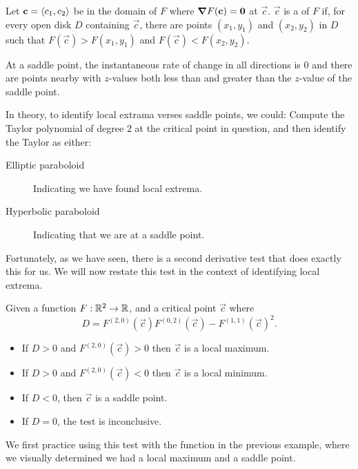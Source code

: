 \documentclass{ximera}
\begin{document}
\begin{definition}
  Let $\mathbf{c}=\left\langle c_1,c_2\right\rangle$ be in the domain of $F$ where $\boldsymbol\nabla
  F(\mathbf{c})=\mathbf{0}$ at $\vec{c}$. $\vec{c}$ is a  of $F$ if,
  for every open disk $D$ containing $\vec{c}$, there are points $(x_1,y_1)$
  and $(x_2,y_2)$ in $D$ such that $F(\vec{c})>F(x_1,y_1)$ and
  $F(\vec{c})<F(x_2,y_2)$.  
\end{definition}

At a saddle point, the instantaneous rate of change in all directions
is $0$ and there are points nearby with $z$-values both less than and
greater than the $z$-value of the saddle point.

In theory, to identify local extrama verses saddle points, we could:
Compute the Taylor polynomial of degree $2$ at the critical point in
question, and then identify the Taylor as either:
\begin{description}
\item[Elliptic paraboloid] Indicating we have found local extrema.
\item[Hyperbolic paraboloid] Indicating that we are at a saddle point.
\end{description}
Fortunately, as we have seen, there is a second derivative test that
does exactly this for us. We will now restate this test in the context
of identifying local extrema.

\begin{theorem}
  Given a function $F:\mathbb R^2\to \mathbb R$, and a critical point $\vec{c}$ where
  \[
  D = F^{(2,0)}(\vec{c})F^{(0,2)}(\vec{c})-F^{(1,1)}(\vec{c})^2.
  \]
  \begin{itemize}
  \item If $D>0$ and $F^{(2,0)}(\vec{c})>0$ then $\vec{c}$ is a local maximum.
  \item If $D>0$ and $F^{(2,0)}(\vec{c})<0$ then $\vec{c}$ is a local minimum.
  \item	If $D<0$, then $\vec{c}$ is a saddle point.
  \item If $D=0$, the test is inconclusive.
  \end{itemize}
\end{theorem}

We first practice using this test with the function in the previous
example, where we visually determined we had a local maximum and a
saddle point.
\end{document}
